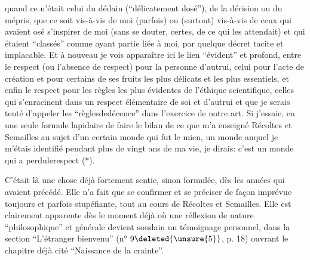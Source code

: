 quand ce n'était celui du dédain (``délicatement dosé''), de la dérision ou du mépris, que ce soit vis-à-vis de moi (parfois) ou (surtout) vis-à-vis de ceux qui avaient osé s'inspirer de moi (sans se douter, certes, de ce qui les attendait) et qui étaient ``classés'' comme ayant partie liée à moi, par quelque décret tacite et implacable. Et à nouveau je vois apparaître ici le lien ``évident'' et profond, entre le r\enspace e\enspace s\enspace p\enspace e\enspace c\enspace t (ou l'absence de respect) pour la personne d'autrui, celui pour l'acte de création et pour certains de ses fruits  les plus délicats et les plus essentiels, et enfin le respect pour les règles les plus évidentes de l'éthique scientifique, celles qui s'enracinent dans un respect élémentaire de soi et d'autrui et que je serais tenté d'appeler les ``r\enspace è\enspace g\enspace l\enspace e\enspace s\quad d\enspace e\quad d\enspace é\enspace{}\enspace c\enspace e\enspace n\enspace c\enspace e'' dans l'exercice de notre art.  Si j'essaie, en une seule formule lapidaire\inserted{,} de faire le bilan de ce que m'a enseigné Récoltes et Semailles au sujet d'un certain monde qui fut le mien, un monde auquel je m'étais identifié pendant plus de vingt ans de ma vie, je dirais: c'est un monde qui a p\enspace e\enspace r\enspace d\enspace u\quad l\enspace e\quad r\enspace e\enspace s\enspace p\enspace e\enspace c\enspace t (*).

C'était là une chose déjà fortement sentie, sinon formulée, dès les années qui avaient précédé. Elle n'a fait que se confirmer et se préciser\inserted{,} de façon  imprévue toujours et parfois stupéfiante, tout au cours de Récoltes et Semailles. Elle est clairement apparente dès le moment déjà où une réflexion de nature ``philosophique'' et générale devient soudain un témoignage personnel, dans la section ``L'étranger bienvenu'' (n° $9\deleted{\unsure{5}}$, p. 18) ouvrant le chapitre déjà cité ``Naissance de la crainte''\deleted{)}.

